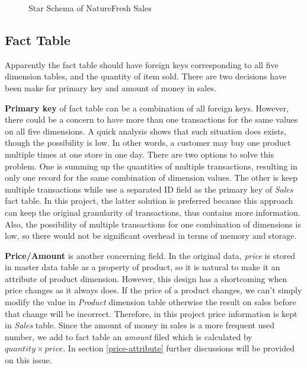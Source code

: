 \documentclass[
  a4paper,
]{article}
\begin{document}
\begin{figure}[htbp]
  \centering
  {
  \fontsize{9}{10}\selectfont
  \def\svgwidth{0.9\columnwidth}
    \resizebox{0.9\textwidth}{!}{}
  }
  \caption{Star Schema of NatureFresh Sales}
  \label{fig:overall}
\end{figure}

\hypertarget{fact-table}{%
\subsection{Fact Table}\label{fact-table}}

Apparently the fact table should have foreign keys corresponding to all
five dimension tables, and the quantity of item sold. There are two
decisions have been make for primary key and amount of money in sales.

\textbf{Primary key} of fact table can be a combination of all foreign
keys. However, there could be a concern to have more than one
transactions for the same values on all five dimensions. A quick
analysis shows that such situation does exists, though the possibility
is low. In other words, a customer may buy one product multiple times at
one store in one day. There are two options to solve this problem. One
is summing up the quantities of multiple transactions, resulting in only
one record for the same combination of dimension values. The other is
keep multiple transactions while use a separated ID field as the primary
key of \emph{Sales} fact table. In this project, the latter solution is
preferred because this approach can keep the original granularity of
transactions, thus contains more information. Also, the possibility of
multiple transactions for one combination of dimensions is low, so there
would not be significant overhead in terms of memory and storage.

\textbf{Price/Amount} is another concerning field. In the original data,
\emph{price} is stored in master data table as a property of product, so
it is natural to make it an attribute of product dimension. However,
this design has a shortcoming when price changes as it always does. If
the price of a product changes, we can't simply modify the value in
\emph{Product} dimension table otherwise the result on sales before that
change will be incorrect. Therefore, in this project price information
is kept in \emph{Sales} table. Since the amount of money in sales is a
more frequent used number, we add to fact table an \emph{amount} filed
which is calculated by \(\mathit{quantity}\times \mathit{price}\). In
section \ref{price-attribute} further discussions will be provided on
this issue.
\end{document}
